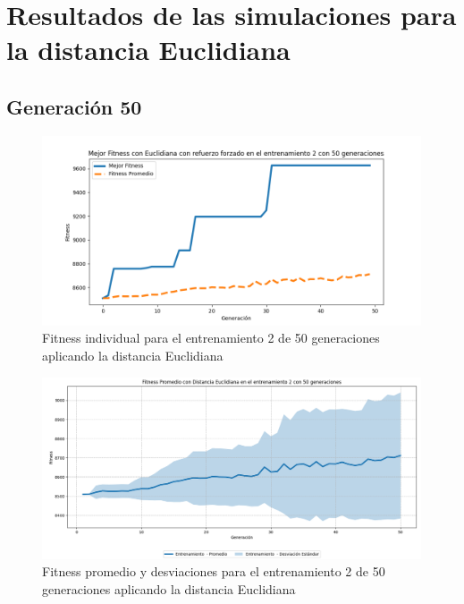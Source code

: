 \documentclass[lettersize, journal]{IEEEtran}
\begin{document}
\section{Resultados de las simulaciones para la distancia Euclidiana}
\subsection{Generación 50}
\setcounter{figure}{0}
\renewcommand{\thefigure}{S\arabic{figure}A-E}


\begin{figure}[H]
    \centering
    \includegraphics[width=0.9 \linewidth]{Euclidiana/Fitnes_individual/Fitness_2_Eucli_50Gen.png}
    \caption{Fitness individual para el entrenamiento 2 de 50 generaciones aplicando la distancia Euclidiana}
    \label{fig:eucli_2_50}
\end{figure}
\begin{figure}[H]
    \centering
    \includegraphics[width=0.9 \linewidth]{Euclidiana/Fitnes_individual/Fitness_2_Eucli_50Gen_Sombra.png}
    \caption{Fitness promedio y desviaciones para el entrenamiento 2 de 50 generaciones aplicando la distancia Euclidiana}
    \label{fig:eucli_2_50_sombra}
\end{figure}
\end{document}
